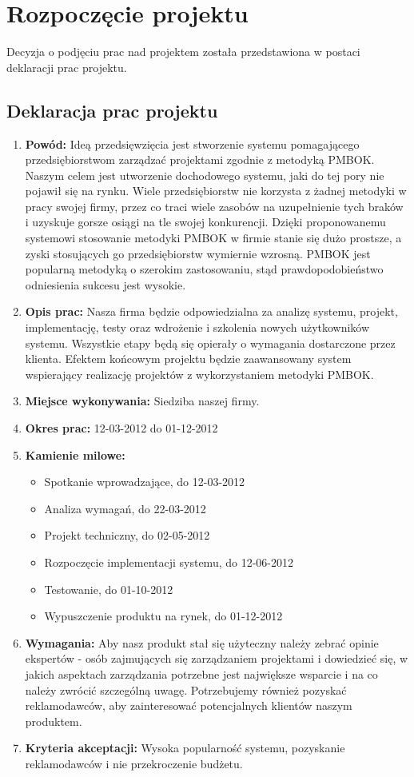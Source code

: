 
\section{Rozpoczęcie projektu}
Decyzja o podjęciu prac nad projektem została przedstawiona w postaci deklaracji prac projektu.
\subsection*{Deklaracja prac projektu}
\begin{enumerate}
	\item \textbf{Powód:} Ideą przedsięwzięcia jest stworzenie systemu pomagającego przedsiębiorstwom zarządzać projektami zgodnie z metodyką PMBOK. Naszym celem jest utworzenie dochodowego systemu, jaki do tej pory nie pojawił się na rynku. Wiele przedsiębiorstw nie korzysta z żadnej metodyki w pracy swojej firmy, przez co traci wiele zasobów na uzupełnienie tych braków i uzyskuje gorsze osiągi na tle swojej konkurencji. Dzięki proponowanemu systemowi stosowanie metodyki PMBOK w firmie stanie się dużo prostsze, a zyski stosujących go przedsiębiorstw wymiernie wzrosną. PMBOK jest popularną metodyką o szerokim zastosowaniu, stąd prawdopodobieństwo odniesienia sukcesu jest wysokie.
	\item \textbf{Opis prac:} Nasza firma będzie odpowiedzialna za analizę systemu, projekt, implementację, testy oraz wdrożenie i szkolenia nowych użytkowników systemu. Wszystkie etapy będą się opierały o wymagania dostarczone przez klienta. Efektem końcowym projektu będzie zaawansowany system wspierający realizację projektów z wykorzystaniem metodyki PMBOK.
	\item \textbf{Miejsce wykonywania:} Siedziba naszej firmy.
	\item \textbf{Okres prac:} 12-03-2012 do 01-12-2012
	\item \textbf{Kamienie milowe:}
		\begin{itemize}
			\item Spotkanie wprowadzające, do 12-03-2012
			\item Analiza wymagań, do 22-03-2012
			\item Projekt techniczny, do 02-05-2012
			\item Rozpoczęcie implementacji systemu, do 12-06-2012
			\item Testowanie, do 01-10-2012
			\item Wypuszczenie produktu na rynek, do 01-12-2012
		\end{itemize}
	\item \textbf{Wymagania:}  Aby nasz produkt stał się użyteczny należy zebrać opinie ekspertów - osób zajmujących się zarządzaniem projektami i dowiedzieć się, w jakich aspektach zarządzania potrzebne jest największe wsparcie i na co należy zwrócić szczególną uwagę. Potrzebujemy również pozyskać reklamodawców, aby zainteresować potencjalnych klientów naszym produktem.
	\item \textbf{Kryteria akceptacji:}  Wysoka popularność systemu, pozyskanie reklamodawców i nie przekroczenie budżetu.
\end{enumerate}

